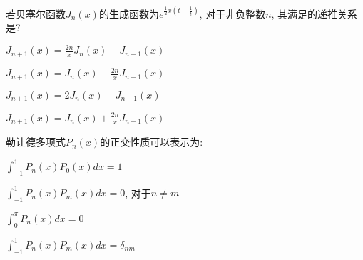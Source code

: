\documentclass{njustexam}
\begin{document}
\begin{problem}
  若贝塞尔函数$J_n(x)$的生成函数为$e^{\frac{1}{2} x (t - \frac{1}{t})}$, 对于非负整数$n$, 其满足的递推关系是?
  \begin{abcd}
    \item  $J_{n+1}(x) = \frac{2n}{x} J_n(x) - J_{n-1}(x)$
    \item  $J_{n+1}(x) = J_n(x) - \frac{2n}{x} J_{n-1}(x)$
    \item  $J_{n+1}(x) = 2 J_n(x) - J_{n-1}(x)$
    \item  $J_{n+1}(x) = J_n(x) + \frac{2n}{x} J_{n-1}(x)$
  \end{abcd}
\end{problem}

\begin{problem}
  勒让德多项式$P_n(x)$的正交性质可以表示为:
  \begin{abcd}
    \item $\int_{-1}^{1} P_n(x) P_0(x) dx = 1$

    \item $\int_{-1}^{1} P_n(x) P_m(x) dx = 0$, 对于$n \neq m$
    
    \item $\int_{0}^{\pi} P_n(x) dx = 0$
    
    \item $\int_{-1}^{1} P_n(x) P_m(x) dx = \delta_{nm}$
  \end{abcd}
\end{problem}


\end{document}
